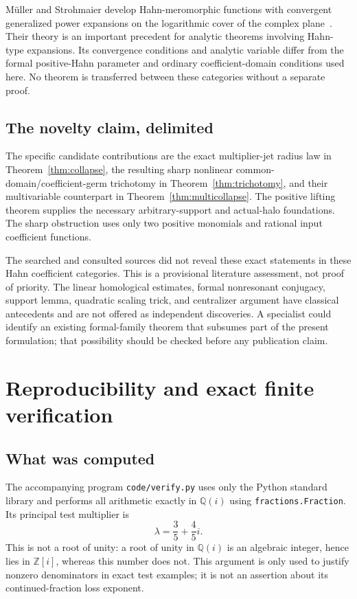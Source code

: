 \documentclass[11pt,a4paper]{article}
\numberwithin{equation}{section}
\theoremstyle{definition}
\theoremstyle{remark}
\newcommand{\Q}{\mathbb Q}
\newcommand{\Z}{\mathbb Z}
\begin{document}
M\"uller and Strohmaier develop Hahn-meromorphic functions with convergent
generalized power expansions on the logarithmic cover of the complex
plane~\cite{MuellerStrohmaier}. Their theory is an important precedent for
analytic theorems involving Hahn-type expansions. Its convergence
conditions and analytic variable differ from the formal positive-Hahn
parameter and ordinary coefficient-domain conditions used here. No theorem
is transferred between these categories without a separate proof.

\subsection{The novelty claim, delimited}

The specific candidate contributions are the exact multiplier-jet radius
law in Theorem~\ref{thm:collapse}, the resulting sharp nonlinear
common-domain/coefficient-germ trichotomy in
Theorem~\ref{thm:trichotomy}, and their multivariable counterpart in
Theorem~\ref{thm:multicollapse}. The positive lifting theorem supplies
the necessary arbitrary-support and actual-halo foundations. The sharp
obstruction uses only two positive monomials and rational input
coefficient functions.

The searched and consulted sources did not reveal these exact statements
in these Hahn coefficient categories. This is a provisional literature
assessment, not proof of priority. The linear homological estimates,
formal nonresonant conjugacy, support lemma, quadratic scaling trick,
and centralizer argument have classical antecedents and are not offered
as independent discoveries. A specialist could identify an existing
formal-family theorem that subsumes part of the present formulation;
that possibility should be checked before any publication claim.

\section{Reproducibility and exact finite verification}\label{sec:verification}

\subsection{What was computed}

The accompanying program \texttt{code/verify.py} uses only the Python
standard library and performs all arithmetic exactly in $\Q(i)$ using
\texttt{fractions.Fraction}. Its principal test multiplier is
\[
 \lambda=\frac35+\frac45i.
\]
This is not a root of unity: a root of unity in $\Q(i)$ is an algebraic
integer, hence lies in $\Z[i]$, whereas this number does not. This
argument is only used to justify nonzero denominators in exact test
examples; it is not an assertion about its continued-fraction loss exponent.
\end{document}
